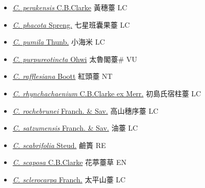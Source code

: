 \begin{itemize}
\begin{itemize}
        \item[] \href{http://www.theplantlist.org/tpl1.1/search?q=Carex+perakensis}{\textit{C. perakensis} C.B.Clarke}   黃穗薹 LC
        \item[] \href{http://www.theplantlist.org/tpl1.1/search?q=Carex+phacota}{\textit{C. phacota} Spreng.}   七星班囊果薹 LC
        \item[] \href{http://www.theplantlist.org/tpl1.1/search?q=Carex+pumila}{\textit{C. pumila} Thunb.}   小海米 LC
        \item[] \href{http://www.theplantlist.org/tpl1.1/search?q=Carex+purpureotincta}{\textit{C. purpureotincta} Ohwi}   太魯閣薹\# VU
        \item[] \href{http://www.theplantlist.org/tpl1.1/search?q=Carex+rafflesiana}{\textit{C. rafflesiana} Boott}   紅頭薹 NT
        \item[] \href{http://www.theplantlist.org/tpl1.1/search?q=Carex+rhynchachaenium}{\textit{C. rhynchachaenium} C.B.Clarke ex Merr.}   初島氏宿柱薹 LC
        \item[] \href{http://www.theplantlist.org/tpl1.1/search?q=Carex+rochebrunei}{\textit{C. rochebrunei} Franch. \& Sav.}   高山穗序薹 LC
        \item[] \href{http://www.theplantlist.org/tpl1.1/search?q=Carex+satzumensis}{\textit{C. satzumensis} Franch. \& Sav.}   油薹 LC
        \item[] \href{http://www.theplantlist.org/tpl1.1/search?q=Carex+scabrifolia}{\textit{C. scabrifolia} Steud.}   鹼簣 RE
        \item[] \href{http://www.theplantlist.org/tpl1.1/search?q=Carex+scaposa}{\textit{C. scaposa} C.B.Clarke}   花葶薹草 EN
        \item[] \href{http://www.theplantlist.org/tpl1.1/search?q=Carex+sclerocarpa}{\textit{C. sclerocarpa} Franch.}   太平山薹 LC

\end{itemize}
\end{itemize}
